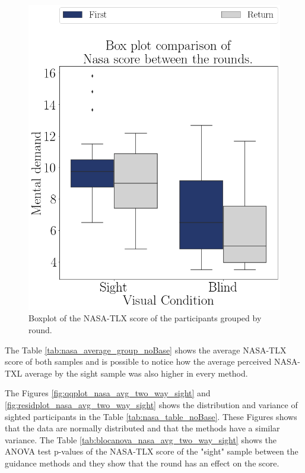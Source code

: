 \begin{figure}[!htb]
\begin{minipage}{0.45\textwidth}
        \includegraphics[width = 0.8\linewidth]{Resultados/Nasa/Figuras/png/boxplot_noBase_nasa_4_rounds.png}
        \caption{Boxplot of the NASA-TLX score of the participants grouped by round.}
        \label{fig:boxplot_noBase_nasa_4_rounds}
    \end{minipage}
\end{figure}

The Table \ref{tab:nasa_average_group_noBase} shows the average NASA-TLX score of both samples and is possible to notice how the average perceived NASA-TXL average by the sight sample was also higher in every method.



The Figures \ref{fig:qqplot_nasa_avg_two_way_sight} and \ref{fig:residplot_nasa_avg_two_way_sight} shows the distribution and variance of sighted participants in the Table \ref{tab:nasa_table_noBase}. These Figures shows that the data are normally distributed and that the methods have a similar variance.
The Table \ref{tab:blocanova_nasa_avg_two_way_sight} shows the ANOVA test p-values of the NASA-TLX score of the "sight" sample between the guidance methods and they show that the round has an effect on the score.



